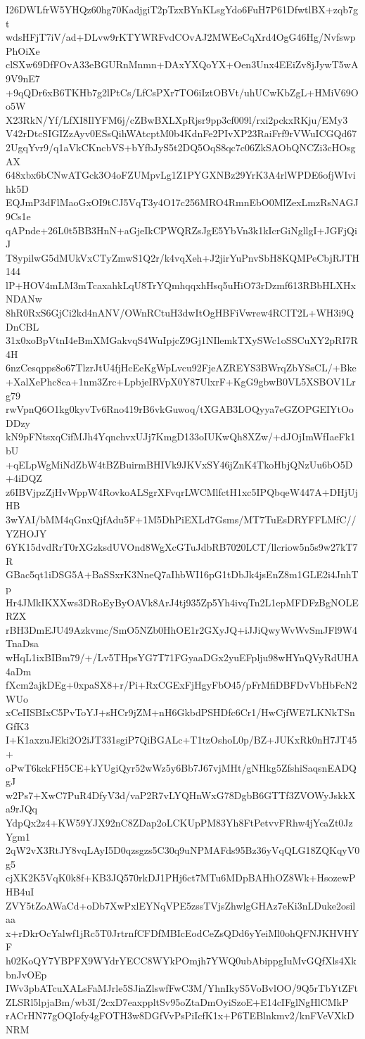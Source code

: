 I26DWLfrW5YHQz60hg70KadjgiT2pTzxBYnKLsgYdo6FuH7P61DfwtlBX+zqb7gt
wdsHFjT7iV/ad+DLvw9rKTYWRFvdCOvAJ2MWEeCqXrd4OgG46Hg/NvfswpPhOiXe
clSXw69DfFOvA33eBGURnMnmn+DAxYXQoYX+Oen3Unx4EEiZv8jJywT5wA9V9nE7
+9qQDr6xB6TKHb7g2lPtCs/LfCsPXr7TO6iIztOBVt/uhUCwKbZgL+HMiV69Oo5W
X23RkN/Yf/LfXI8IlYFM6j/cZBwBXLXpRjsr9pp3cf009l/rxi2pckxRKju/EMy3
V42rDtcSIGIZzAyv0ESsQihWAtcptM0b4KdnFe2PIvXP23RaiFrf9rVWuICGQd67
2UgqYvr9/q1aVkCKncbVS+bYfbJyS5t2DQ5OqS8qc7c06ZkSAObQNCZi3cHOsgAX
648xbx6bCNwATGck3O4oFZUMpvLg1Z1PYGXNBz29YrK3A4rlWPDE6ofjWIvihk5D
EQJmP3dFlMaoGxOI9tCJ5VqT3y4O17c256MRO4RmnEbO0MlZexLmzRsNAGJ9Cs1e
qAPnde+26L0t5BB3HnN+aGjeIkCPWQRZsJgE5YbVn3k1kIcrGiNgllgI+JGFjQiJ
T8ypilwG5dMUkVxCTyZmwS1Q2r/k4vqXeh+J2jirYuPnvSbH8KQMPeCbjRJTH144
lP+HOV4mLM3mTcaxahkLqU8TrYQmhqqxhHsq5uHiO73rDzmf613RBbHLXHxNDANw
8hR0RxS6GjCi2kd4nANV/OWnRCtuH3dwItOgHBFiVwrew4RCIT2L+WH3i9QDnCBL
31x0xoBpVtnI4eBmXMGakvqS4WuIpjcZ9Gj1NIlemkTXySWc1oSSCuXY2pRI7R4H
6nzCesqpps8o67TlzrJtU4fjHcEeKgWpLvcu92FjeAZREYS3BWrqZbYSsCL/+Bke
+XalXePhc8ca+1nm3Zrc+LpbjeIRVpX0Y87UlxrF+KgG9gbwB0VL5XSBOV1Lrg79
rwVpnQ6O1kg0kyvTv6Rno419rB6vkGuwoq/tXGAB3LOQyya7eGZOPGEIYtOoDDzy
kN9pFNtsxqCifMJh4YqnchvxUJj7KmgD133oIUKwQh8XZw/+dJOjImWfIaeFk1bU
+qELpWgMiNdZbW4tBZBuirmBHIVk9JKVxSY46jZnK4TkoHbjQNzUu6bO5D+4iDQZ
z6IBVjpzZjHvWppW4RovkoALSgrXFvqrLWCMlfctH1xc5IPQbqeW447A+DHjUjHB
3wYAI/bMM4qGnxQjfAdu5F+1M5DhPiEXLd7Gsms/MT7TuEsDRYFFLMfC//YZHOJY
6YK15dvdRrT0rXGzksdUVOnd8WgXcGTuJdbRB7020LCT/llcriow5n5s9w27kT7R
GBac5qt1iDSG5A+BaSSxrK3NneQ7aIhbWI16pG1tDbJk4jsEnZ8m1GLE2i4JnhTp
Hr4JMkIKXXws3DRoEyByOAVk8ArJ4tj935Zp5Yh4ivqTn2L1epMFDFzBgNOLERZX
rBH3DmEJU49Azkvmc/SmO5NZb0HhOE1r2GXyJQ+iJJiQwyWvWvSmJFl9W4TnaDsa
wHqL1ixBIBm79/+/Lv5THpsYG7T71FGyaaDGx2yuEFplju98wHYnQVyRdUHA4aDm
fXcm2ajkDEg+0xpaSX8+r/Pi+RxCGExFjHgyFbO45/pFrMfiDBFDvVbHbFcN2WUo
xCeIISBIxC5PvToYJ+sHCr9jZM+nH6GkbdPSHDfc6Cr1/HwCjfWE7LKNkTSnGfK3
I+K1axzuJEki2O2iJT331sgiP7QiBGALc+T1tzOshoL0p/BZ+JUKxRk0nH7JT45+
oPwT6kckFH5CE+kYUgiQyr52wWz5y6Bb7J67vjMHt/gNHkg5ZfshiSaqsnEADQgJ
w2Ps7+XwC7PuR4DfyV3d/vaP2R7vLYQHnWxG78DgbB6GTTf3ZVOWyJskkXa9rJQq
YdpQx2z4+KW59YJX92nC8ZDap2oLCKUpPM83Yh8FtPetvvFRhw4jYcaZt0JzYgm1
2qW2vX3RtJY8vqLAyI5D0qzsgzs5C30q9uNPMAFds95Bz36yVqQLG18ZQKqyV0g5
cjXK2K5VqK0k8f+KB3JQ570rkDJ1PHj6ct7MTu6MDpBAHhOZ8Wk+HsozewPHB4uI
ZVY5tZoAWaCd+oDb7XwPxlEYNqVPE5zssTVjsZhwlgGHAz7eKi3nLDuke2osilaa
x+rDkrOcYalwf1jRc5T0JrtrnfCFDfMBIcEodCeZsQDd6yYeiMl0ohQFNJKHVHYF
h02KoQY7YBPFX9WYdrYECC8WYkPOmjh7YWQ0ubAbippgIuMvGQfXls4XkbnJvOEp
IWv3pbATcuXALsFaMJrle5SJiaZlswfFwC3M/YhnIkyS5VoBvlOO/9Q5rTbYtZFt
ZLSRl5lpjaBm/wb3I/2cxD7eaxppltSv95oZtaDmOyiSzoE+E14cIFglNgHlCMkP
rACrHN77gOQIofy4gFOTH3w8DGfVvPsPiIcfK1x+P6TEBlnkmv2/knFVeVXkDNRM
